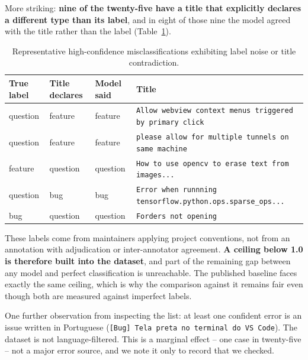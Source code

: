 More striking: \textbf{nine of the twenty-five have a title that explicitly declares a different type than its label}, and in eight of those nine the model agreed with the title rather than the label (Table~\ref{tab:confident_error_examples}).

\begin{table}[H]
\centering
\caption{Representative high-confidence misclassifications exhibiting label noise or title contradiction.}
\label{tab:confident_error_examples}
\vspace{0.5em}
\begin{tabular}{l l l p{7cm}}
\hline
True label & Title declares & Model said & Title \\
\hline
question & feature & feature & \texttt{Allow webview context menus triggered by primary click} \\
question & feature & feature & \texttt{please allow for multiple tunnels on same machine} \\
feature & question & question & \texttt{How to use opencv to erase text from images...} \\
question & bug & bug & \texttt{Error when runnning tensorflow.python.ops.sparse\_ops...} \\
bug & question & question & \texttt{Forders not opening} \\
\hline
\end{tabular}
\end{table}

These labels come from maintainers applying project conventions, not from an annotation with adjudication or inter-annotator agreement. \textbf{A ceiling below 1.0 is therefore built into the dataset}, and part of the remaining gap between any model and perfect classification is unreachable. The published baseline faces exactly the same ceiling, which is why the comparison against it remains fair even though both are measured against imperfect labels.

One further observation from inspecting the list: at least one confident error is an issue written in Portuguese (\texttt{[Bug] Tela preta no terminal do VS Code}). The dataset is not language-filtered. This is a marginal effect -- one case in twenty-five -- not a major error source, and we note it only to record that we checked.

